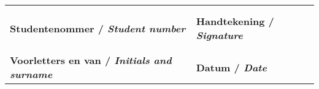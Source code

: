 \begin{center}
\begin{table}
\begin{tabular} { | p{9.1cm} | p{6cm} | }
	\hline
	& \\
	& \\
	 \textbf{ Studentenommer / \textit{Student number}} & \textbf{ Handtekening / \textit{Signature}} \\
	\hline
	& \\
	& \\
	\textbf{ Voorletters en van / \textit{Initials and surname }} & \textbf{ Datum / \textit{Date}} \\
	\hline
\end{tabular}
\end{table}

\end{center}